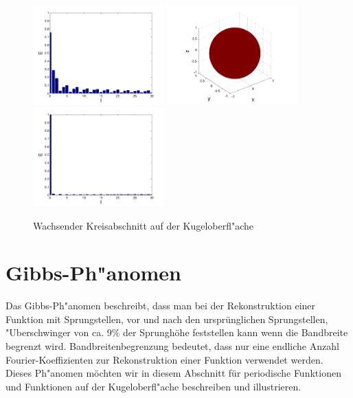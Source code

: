 \begin{refsection}
\begin{figure}
\includegraphics[width=0.45\textwidth]{kugel/Dkonstant/Kugel3_2.pdf}
\includegraphics[width=0.45\textwidth]{kugel/Dkonstant/Kugel4_1.pdf}
\includegraphics[width=0.45\textwidth]{kugel/Dkonstant/Kugel4_2.pdf}
\caption{Wachsender Kreisabschnitt auf der Kugeloberfl"ache
\label{skript:Dirac2}}
\end{figure}

\section{Gibbs-Ph"anomen}
Das Gibbs-Ph"anomen beschreibt, dass man bei der Rekonstruktion einer
Funktion mit Sprungstellen, vor und nach den ursprünglichen Sprungstellen, 
"Uberschwinger von ca. 9\% der Sprunghöhe feststellen kann wenn die 
Bandbreite begrenzt wird. 
Bandbreitenbegrenzung bedeutet, dass nur eine endliche Anzahl 
Fourier-Koeffizienten zur Rekonstruktion einer Funktion verwendet werden. 
Dieses Ph"anomen möchten wir in diesem Abschnitt für periodische 
Funktionen und Funktionen auf der Kugeloberfl"ache beschreiben und 
illustrieren.


\end{refsection}
